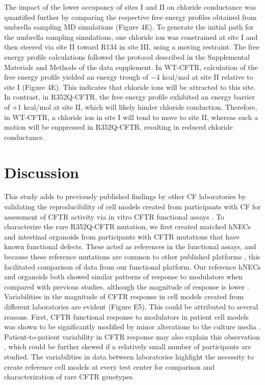 The impact of the lower occupancy of sites I and II on chloride conductance was quantified further by comparing the respective free energy profiles obtained from umbrella sampling MD simulations (Figure 4E). To generate the initial path for the umbrella sampling simulations, one chloride ion was constrained at site I and then steered via site II toward R134 in site III, using a moving restraint. The free energy profile calculations followed the protocol described in the Supplemental Materials and Methods of the data supplement. In WT-CFTR, calculation of the free energy profile yielded an energy trough of −4 kcal/mol at site II relative to site I (Figure 4E). This indicates that chloride ions will be attracted to this site. In contrast, in R352Q-CFTR, the free energy profile exhibited an energy barrier of +1 kcal/mol at site II, which will likely hinder chloride conduction. Therefore, in WT-CFTR, a chloride ion in site I will tend to move to site II, whereas such a motion will be suppressed in R352Q-CFTR, resulting in reduced chloride conductance.

\section{Discussion}
This study adds to previously published findings by other CF laboratories by validating the reproducibility of cell models created from participants with CF for assessment of CFTR activity via in vitro CFTR functional assays \cite{dekkers2016, ramalho2021}. To characterize the rare R352Q-CFTR mutation, we first created matched hNECs and intestinal organoids from participants with CFTR mutations that have known functional defects. These acted as references in the functional assays, and because these reference mutations are common to other published platforms \cite{dekkers2016, ramalho2021}, this facilitated comparison of data from our functional platform. Our reference hNECs and organoids both showed similar patterns of response to modulators when compared with previous studies, although the magnitude of response is lower \cite{dekkers2016, ramalho2021, pranke2017, pranke2019a}. Variabilities in the magnitude of CFTR response in cell models created from different laboratories are evident (Figure E5). This could be attributed to several reasons. First, CFTR functional response to modulators in patient cell models was shown to be significantly modified by minor alterations to the culture media \cite{gentzsch2017, saint-criq2020}. Patient-to-patient variability in CFTR response may also explain this observation \cite{pranke2017, matthes2018, brewington2018}, which could be further skewed if a relatively small number of participants are studied. The variabilities in data between laboratories highlight the necessity to create reference cell models at every test center for comparison and characterization of rare CFTR genotypes.

